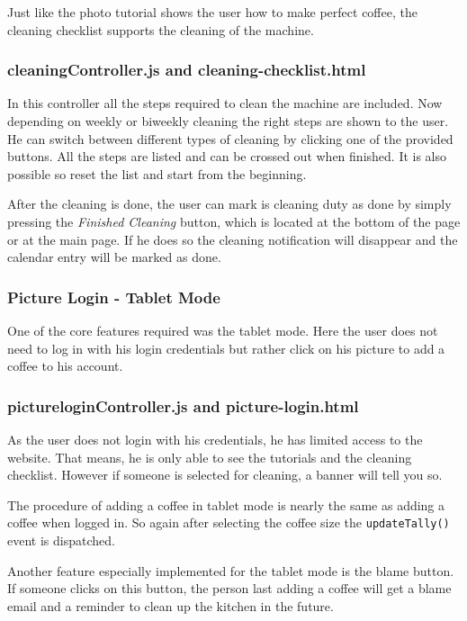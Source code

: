 Just like the photo tutorial shows the user how to make perfect coffee,
the cleaning checklist supports the cleaning of the machine.

\subsubsection*{cleaningController.js and cleaning-checklist.html}

In this controller all the steps required to clean the machine are
included. Now depending on weekly or biweekly cleaning the right steps
are shown to the user. He can switch between different types of cleaning
by clicking one of the provided buttons. All the steps are listed and
can be crossed out when finished. It is also possible so reset the list
and start from the beginning.

After the cleaning is done, the user can mark is cleaning duty as done
by simply pressing the \emph{Finished Cleaning} button, which is located
at the bottom of the page or at the main page. If he does so the
cleaning notification will disappear and the calendar entry will be
marked as done.

\subsubsection{Picture Login - Tablet
Mode}\label{picture-login---tablet-mode}

One of the core features required was the tablet mode. Here the user
does not need to log in with his login credentials but rather click on
his picture to add a coffee to his account.

\subsubsection*{pictureloginController.js and picture-login.html}

As the user does not login with his credentials, he has limited access
to the website. That means, he is only able to see the tutorials and the
cleaning checklist. However if someone is selected for cleaning, a
banner will tell you so.

The procedure of adding a coffee in tablet mode is nearly the same as
adding a coffee when logged in. So again after selecting the coffee size
the \texttt{updateTally()} event is dispatched.

Another feature especially implemented for the tablet mode is the blame
button. If someone clicks on this button, the person last adding a coffee
will get a blame email and a reminder to clean up the kitchen in the
future.

